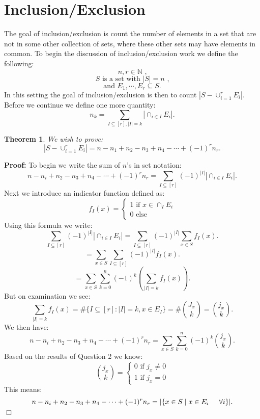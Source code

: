 \documentclass[11pt]{article}
\newtheorem{theorem}{Theorem}
\newenvironment{proof}{\noindent \textbf{Proof:}}{$\Box$}
\begin{document}
\section{Inclusion/Exclusion}
The goal of inclusion/exclusion is count the number of elements in a set that are not in some other collection of sets, where these other sets may have elements in common. To begin the discussion of inclusion/exclusion work we define the following:
	\[n,r \in \mathbb{N}\mbox{ ,} \]
	\[S \mbox{ is a set with } |S|=n \mbox{ ,}\]
	\[\mbox{and } E_1,\cdots,E_r \subseteq S .\]
In this setting the goal of inclusion/exclusion is then to count $|S-\cup^r_{i=1} E_i|$. Before we continue we define one more quantity:
	\[n_k = \sum_{I \subseteq [r], |I|=k} |\cap_{i\in I}E_i|.\]

\begin{theorem}
We wish to prove:
	\[|S-\cup^r_{i=1} E_i|=n-n_1+n_2-n_3+n_4-\cdots +(-1)^r n_r. \]
\end{theorem}

\begin{proof}
To begin we write the sum of $n$'s in set notation:
	\[n-n_i+n_2-n_3+ n_4-\cdots +(-1)^r n_r=\sum_{I\subseteq [r]}(-1)^{|I|}|\cap_{i\in I} E_i|. \]
Next we introduce an indicator function defined as:
 \begin{displaymath}
   f_I(x) = \left\{
     \begin{array}{l}
       1 \mbox{ if } x \in \cap_I E_i\\
       0 \mbox{ else}
     \end{array}
   \right.
\end{displaymath} 
Using this formula we write:
	\[\sum_{I\subseteq [r]}(-1)^{|I|}|\cap_{i\in I} E_i|=\sum_{I\subseteq [r]}(-1)^{|I|}\sum_{x \in S} f_I(x). \]
	\[=\sum_{x \in S}\sum_{I\subseteq [r]}(-1)^{|I|}f_I(x). \]
	\[=\sum_{x \in S}\sum_{k=0}^n(-1)^{k}(\sum_{|I|=k} f_I(x)). \]
But on examination we see:
	\[\sum_{|I|=k} f_I(x)= \#\{I \subseteq [r] : |I|=k, x \in E_I\}=\#{J_x \choose k} = {j_x \choose k}. \]
We then have:
	\[n-n_i+n_2-n_3+ n_4-\cdots +(-1)^r n_r=\sum_{x \in S}\sum_{k=0}^n(-1)^{k}{j_x \choose k}. \]
Based on the results of Question 2 we know:
 \begin{displaymath}
   {j_x \choose k} = \left\{
     \begin{array}{l}
       0 \mbox{ if } j_x\neq 0\\
       1 \mbox{ if } j_x=0
     \end{array}
   \right.
\end{displaymath} 
This means:
	\[n-n_i+n_2-n_3+ n_4-\cdots +(-1)^r n_r= |\{x \in S \mid x\in E_i \hspace{5 mm} \forall i\}|. \]
\end{proof}
\end{document}
